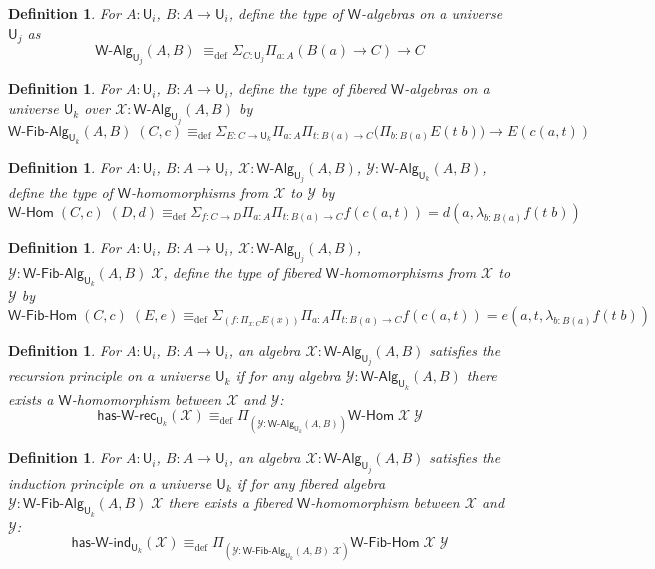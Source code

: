 \documentclass[reqno,10pt,a4paper,oneside]{amsart}
\numberwithin{equation}{section}
\theoremstyle{mythm}
\theoremstyle{mydef}
\newtheorem{definition}[theorem]{Definition}
\theoremstyle{myrmk}
\newcommand{\deq}{\equiv}
\newcommand{\defeq}{\deq_{\mathrm{def}}}
\newcommand{\prd}[1]{\Pi_{#1}}
\newcommand{\sm}[1]{\Sigma_{#1}}
\newcommand{\lam}[1]{\lambda_{#1}}
\newcommand{\W}{\mathsf{W}}
\newcommand{\UU}{\mathsf{U}}
\newcommand{\WAlg}{\mathsf{W}\text{-}\mathsf{Alg}}
\newcommand{\WFibAlg}{\mathsf{W}\text{-}\mathsf{Fib}\text{-}\mathsf{Alg}}
\newcommand{\WHom}{\mathsf{W}\text{-}\mathsf{Hom}}
\newcommand{\WFibHom}{\mathsf{W}\text{-}\mathsf{Fib}\text{-}\mathsf{Hom}}
\newcommand{\HasWRec}{\mathsf{has}\text{-}\mathsf{W}\text{-}\mathsf{rec}}
\newcommand{\HasWInd}{\mathsf{has}\text{-}\mathsf{W}\text{-}\mathsf{ind}}
\newcommand{\X}{\mathcal{X}}
\newcommand{\Y}{\mathcal{Y}}
\begin{document}
\begin{definition}\label{def:WAlg}
For $A:\UU_i$, $B : A \to \UU_i$, define the type of \emph{$\W$-algebras} on a universe $\UU_j$ as
\[\WAlg_{\UU_j}(A,B) \; \defeq \sm{C : \UU_j} \prd{a:A} (B(a) \to C) \to C \]
\end{definition}

\begin{definition}\label{def:WFibAlg}
For $A:\UU_i$, $B : A \to \UU_i$, define the type of \emph{fibered $\W$-algebras} on a universe $\UU_k$ over $\mathcal{X} : \WAlg_{\UU_j}(A,B)$ by
\[\WFibAlg_{\UU_k}(A,B) \; (C,c) \defeq \sm{E : C \to \UU_k} \prd{a:A}\prd{t: B(a) \to C} \big(\prd{b:B(a)} E(t \;b) \big) \to E(c(a,t)) \]
\end{definition}

\begin{definition}\label{def:WHom}
For $A:\UU_i$, $B : A \to \UU_i$, $\X : \WAlg_{\UU_j}(A,B)$, $\Y : \WAlg_{\UU_k}(A,B)$, define the type of \emph{$\W$-homomorphisms} from $\X$ to $\Y$ by
\[ \WHom \; (C,c) \; (D,d) \defeq \sm{f:C\to D}\prd{a:A}\prd{t: B(a) \to C} f(c(a,t)) = d(a,\lam{b:B(a)} f(t\;b)) \]
\end{definition}

\begin{definition}\label{def:WFibHom}
For $A:\UU_i$, $B : A \to \UU_i$, $\X : \WAlg_{\UU_j}(A,B)$, $\Y : \WFibAlg_{\UU_k}(A,B) \; \X$, define the type of \emph{fibered $\W$-homomorphisms} from $\X$ to $\Y$ by
\[ \WFibHom \; (C,c) \; (E,e) \defeq \sm{(f:\prd{x:C}E(x))}\prd{a:A}\prd{t: B(a) \to C} f(c(a,t)) = e(a,t,\lam{b:B(a)} f(t\;b)) \]
\end{definition}

\begin{definition}\label{def:WRec}
For $A:\UU_i$, $B : A \to \UU_i$, an algebra $\X : \WAlg_{\UU_j}(A,B)$ \emph{satisfies the recursion principle} on a universe $\UU_k$ if for any algebra $\Y : \WAlg_{\UU_k}(A,B)$ there exists
a $\W$-homomorphism between $\X$ and $\Y$:
\[ \HasWRec_{\UU_k}(\X) \defeq \prd{(\Y:\WAlg_{\UU_k}(A,B))} \WHom \; \X \; \Y \]
\end{definition}

\begin{definition}\label{def:WInd}
For $A:\UU_i$, $B : A \to \UU_i$, an algebra $\X : \WAlg_{\UU_j}(A,B)$ \emph{satisfies the induction principle} on a universe $\UU_k$ if for any fibered algebra $\Y : \WFibAlg_{\UU_k}(A,B) \; \X$ there exists a fibered $\W$-homomorphism between $\X$ and $\Y$:
\[ \HasWInd_{\UU_k}(\X) \defeq \prd{(\Y:\WFibAlg_{\UU_k}(A,B) \; \X)} \WFibHom \; \X \; \Y \]
\end{definition}
\end{document}
